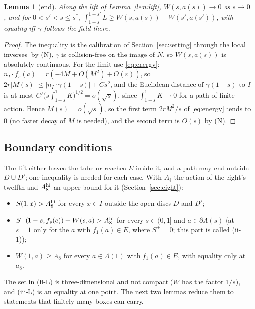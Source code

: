 \documentclass[11pt]{article}
\newtheorem{lemma}[theorem]{Lemma}
\theoremstyle{definition}
\begin{document}
\begin{lemma}[end]\label{lem:end}
Along the lift of Lemma~\ref{lem:lift}, $W(s,a(s))\to0$ as $s\to0$, and for $0<s'<s\le s^*$,
$\int_{1-s}^{1-s'}L\ge W(s,a(s))-W(s',a(s'))$, with equality iff $\gamma$ follows the field there.
\end{lemma}
\begin{proof}
The inequality is the calibration of Section~\ref{sec:setting} through the local inverses; by (N), $\gamma$ is
collision-free on the image of $N$, so $W(s,a(s))$ is absolutely continuous. For the limit use \eqref{eq:energy}:
$n_I\cdot f_s(a)=r(-4M+O(M^2)+O(\varepsilon))$, so $2r|M(s)|\le|n_I\cdot\gamma(1-s)|+Cs^2$, and the Euclidean distance
of $\gamma(1-s)$ to $I$ is at most $C'\bigl(s\int_{1-s}^1K\bigr)^{1/2}=o(\sqrt s)$, since $\int_{1-s}^1K\to0$ for a
path of finite action. Hence $M(s)=o(\sqrt s)$, so the first term $2rM^2/s$ of \eqref{eq:energy} tends to $0$ (no
faster decay of $M$ is needed), and the second term is $O(s)$ by (N).
\end{proof}

\subsection{Boundary conditions}\label{sec:bc}
The lift either leaves the tube or reaches $E$ inside it, and a path may end outside $D\cup D'$; one inequality is
needed for each case. With $A_8$ the action of the eight's twelfth and $A_8^{\rm hi}$ an upper bound for it
(Section~\ref{sec:eight}):
\begin{itemize}
\item[(ii$'$)] $S(1,x)>A_8^{\rm hi}$ for every $x\in I$ outside the open discs $D$ and $D'$;
\item[(ii-L)] $S^+(1-s,f_s(a))+W(s,a)>A_8^{\rm hi}$ for every $s\in(0,1]$ and $a\in\partial\Lambda(s)$ (at $s=1$ only for
the $a$ with $f_1(a)\in E$, where $S^+=0$; this part is called (ii-1));
\item[(iii-L)] $W(1,a)\ge A_8$ for every $a\in\Lambda(1)$ with $f_1(a)\in E$, with equality only at $a_8$.
\end{itemize}
The set in (ii-L) is three-dimensional and not compact ($W$ has the factor $1/s$), and (iii-L) is an equality at one
point. The next two lemmas reduce them to statements that finitely many boxes can carry.
\end{document}
